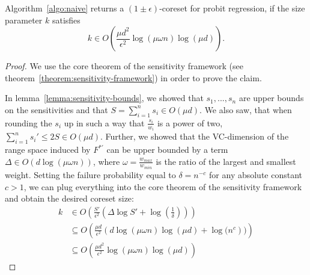 \begin{theorem}
    Algorithm~\ref{algo:naive} returns a $(1 \pm \epsilon)$-coreset
    for probit regression, if the size parameter $k$ satisfies
    \begin{equation*}
        k \in O\left(\frac{\mu d^2}{\epsilon^2} \log(\mu \omega n) \log(\mu d)\right).
    \end{equation*}
\end{theorem}
\begin{proof}
    We use the core theorem of the sensitivity framework
    (see theorem~\ref{theorem:sensitivity-framework}) in order
    to prove the claim.

    In lemma~\ref{lemma:sensitivity-bounds},
    we showed that $s_1, ..., s_n$
    are upper bounds on the sensitivities and that
    $S = \sum_{i=1}^n s_i \in O(\mu d)$.
    We also saw, that when rounding the $s_i$ up in such a way that
    $\frac{s_i}{w_i}$ is a power of two,
    $\sum_{i=1}^n s_i' \leq 2S \in O(\mu d)$.
    Further, we showed that the VC-dimension of the range space
    induced by $F^{\ast '}$ can be upper bounded by
    a term $\Delta \in O(d\log(\mu \omega n))$, where
    $\omega = \frac{w_{max}}{w_{min}}$ is the ratio of the
    largest and smallest weight.
    Setting the failure probability equal to $\delta = n^{-c}$
    for any absolute constant $c > 1$, we can plug everything
    into the core theorem of the sensitivity framework and
    obtain the desired coreset size:
    \begin{align*}
        k & \in O\left( \frac{S'}{\epsilon^2} \left(\Delta \log S' + \log\left(\frac{1}{\delta}\right)\right)\right)  \\
          & \subseteq O\left(\frac{\mu d}{\epsilon^2}\left(d \log(\mu \omega n) \log(\mu d) + \log(n^c\right))\right) \\
          & \subseteq O\left(\frac{\mu d^2}{\epsilon^2}\log(\mu \omega n) \log(\mu d)\right)
    \end{align*}
\end{proof}
